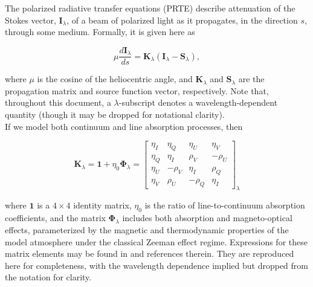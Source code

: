\documentclass[11pt]{article}
\begin{document}
The polarized radiative transfer equations (PRTE) describe attenuation of the Stokes vector,
$\mathbf{I}_{\lambda}$, of a beam of polarized light as it propagates, in the direction $s$, through
some medium.  Formally, it is given here as

\begin{equation}\label{eq:prte}
\mu\frac{d\mathbf{I}_{\lambda}}{ds} = \mathbf{K}_{\lambda}\left(\mathbf{I}_{\lambda} -
         \mathbf{S}_{\lambda}\right),
\end{equation}

where $\mu$ is the cosine of the heliocentric angle, and $\mathbf{K}_{\lambda}$
and $\mathbf{S}_{\lambda}$ are the propagation matrix and source function vector,
respectively.  Note that, throughout this document, a $\lambda$-subscript denotes a
wavelength-dependent quantity (though it may be dropped for notational clarity).\\

If we model both continuum and line absorption processes, then

\begin{equation}
\mathbf{K}_{\lambda} = \mathbf{1} + \eta_{0}\mathbf{\Phi}_{\lambda} = 
\begin{bmatrix}\eta_{I}&\eta_{Q}&\eta_{U}&\eta_{V}\\
               \eta_{Q}&\eta_{I}&\rho_{V}&-\rho_{U}\\
               \eta_{U}&-\rho_{V}&\eta_{I}&\rho_{Q}\\
               \eta_{V}&\rho_{U}&-\rho_{Q}&\eta_{I}\end{bmatrix}_{\lambda}
\end{equation}

where $\mathbf{1}$ is a $4 \times 4$ identity matrix, $\eta_{0}$ is the ratio of line-to-continuum
absorption coefficients, and the matrix $\mathbf{\Phi}_{\lambda}$ includes both absorption and
magneto-optical effects, parameterized by the magnetic and thermodynamic properties of the
model atmosphere under the classical Zeeman effect regime.  Expressions for these matrix
elements may be found in \citet{deglinnocenti:2004} and references therein.  They are reproduced
here for completeness, with the wavelength dependence implied but dropped from the notation for
clarity.
\end{document}
